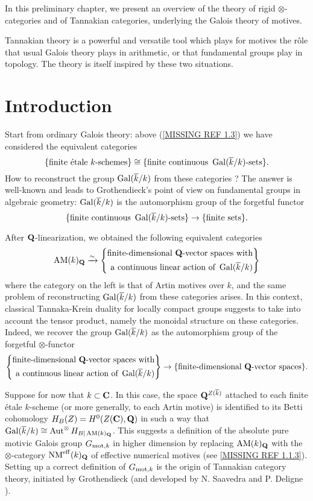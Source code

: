 \documentclass[../main.tex]{subfiles}
\begin{document}
In this preliminary chapter, we present an overview of the theory of rigid $\otimes$-categories and of Tannakian categories, underlying the Galois theory of motives.

Tannakian theory is a powerful and versatile tool which plays for motives the rôle that usual Galois theory plays in arithmetic, or that fundamental groups play in topology.
The theory is itself inspired by these two situations.

\section{Introduction}

Start from ordinary Galois theory: above (\ref{MISSING REF 1.3}) we have considered the equivalent categories
$$\{\text{finite étale }k\text{-schemes}\} \cong \{\text{finite continuous }\operatorname{Gal}(\overline{k}/k)\text{-sets}\}.$$
How to reconstruct the group $\operatorname{Gal}(\overline{k}/k)$ from these categories ?
The answer is well-known and leads to Grothendieck's point of view on fundamental groups in algebraic geometry: $\operatorname{Gal}(\overline{k}/k)$ is the automorphism group of the forgetful functor
$$\{\text{finite continuous }\operatorname{Gal}(\overline{k}/k)\text{-sets}\} \to \{\text{finite sets}\}.$$

After $\mathbf{Q}$-linearization, we obtained the following equivalent categories
$$
    \operatorname{AM}(k)_{\mathbf{Q}}
    \xrightarrow{\sim}
    \left\{\begin{aligned}\text{finite-dimensional }\mathbf{Q}\text{-vector spaces with}\\
    \text{a continuous linear action of }\operatorname{Gal}(\overline{k}/k)\end{aligned}\right\}
$$
where the category on the left is that of Artin motives over $k$, and the same problem of reconstructing $\operatorname{Gal}(\overline{k}/k)$ from these categories arises.
In this context, classical Tannaka-Krein duality for locally compact groups suggests to take into account the tensor product, namely the monoidal structure on these categories.
Indeed, we recover the group $\operatorname{Gal}(\overline{k}/k)$ as the automorphism group of the forgetful $\otimes$-functor
$$
    \left\{\begin{aligned}\text{finite-dimensional }\mathbf{Q}\text{-vector spaces with}\\
    \text{a continuous linear action of }\operatorname{Gal}(\overline{k}/k)\end{aligned}\right\}
    \to
    \{\text{finite-dimensional }\mathbf{Q}\text{-vector spaces}\}.
$$

Suppose for now that $k \subset \mathbf{C}$.
In this case, the space $\mathbf{Q}^{Z(\overline{k})}$ attached to each finite étale $k$-scheme (or more generally, to each Artin motive) is identified to its Betti cohomology $H_B(Z) = H^0(Z(\mathbf{C}), \mathbf{Q})$ in such a way that $\operatorname{Gal}(\overline{k}/k) \cong \operatorname{Aut}^{\otimes} H_{B|\operatorname{AM}(k)_{\mathbf{Q}}}$.
This suggests a definition of the absolute pure motivic Galois group $G_{\mathrm{mot}, k}$ in higher dimension by replacing $\operatorname{AM}(k)_{\mathbf{Q}}$ with the $\otimes$-category $\operatorname{NM}^{\mathrm{eff}}(k)_{\mathbf{Q}}$ of effective numerical motives (see \ref{MISSING REF 1.1.3}).
Setting up a correct definition of $G_{\mathrm{mot}, k}$ is the origin of Tannakian category theory, initiated by Grothendieck (and developed by N. Saavedra \cite{saavedra72} and P. Deligne \cite{deligne90}).
\end{document}
